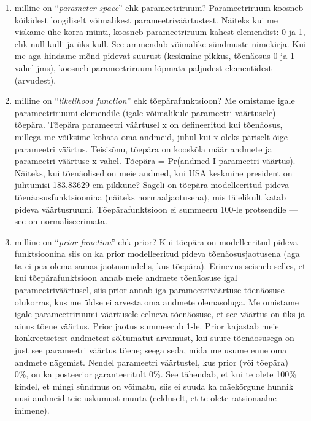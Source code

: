 \documentclass[]{book}
\begin{document}
\begin{enumerate}
\def\labelenumi{\arabic{enumi})}
\item
  milline on ``\emph{parameter space}'' ehk parameetriruum?
  Parameetriruum koosneb kõikidest loogiliselt võimalikest
  parameetriväärtustest. Näiteks kui me viskame ühe korra münti, koosneb
  parameetriruum kahest elemendist: 0 ja 1, ehk null kulli ja üks kull.
  See ammendab võimalike sündmuste nimekirja. Kui me aga hindame mõnd
  pidevat suurust (keskmine pikkus, tõenäosus 0 ja 1 vahel jms), koosneb
  parameetriruum lõpmata paljudest elementidest (arvudest).
\item
  milline on ``\emph{likelihood function}'' ehk tõepärafunktsioon? Me
  omistame igale parameetriruumi elemendile (igale võimalikule
  parameetri väärtusele) tõepära. Tõepära parameetri väärtusel x on
  defineeritud kui tõenäosus, millega me võiksime kohata oma andmeid,
  juhul kui x oleks päriselt õige parameetri väärtus. Teisisõnu, tõepära
  on kooskõla määr andmete ja parameetri väärtuse x vahel. Tõepära =
  Pr(andmed I parameetri väärtus). Näiteks, kui tõenäolised on meie
  andmed, kui USA keskmine president on juhtumisi 183.83629 cm pikkune?
  Sageli on tõepära modelleeritud pideva tõenäosusfunktsioonina (näiteks
  normaaljaotusena), mis täielikult katab pideva väärtusruumi.
  Tõepärafunktsioon ei summeeru 100-le protsendile --- see on
  normaliseerimata.
\item
  milline on ``\emph{prior function}'' ehk prior? Kui tõepära on
  modelleeritud pideva funktsioonina siis on ka prior modelleeritud
  pideva tõenäosusjaotusena (aga ta ei pea olema samas jaotusmudelis,
  kus tõepära). Erinevus seisneb selles, et kui tõepärafunktsioon annab
  meie andmete tõenäosuse igal parameetriväärtusel, siis prior annab iga
  parameetriväärtuse tõenäosuse olukorras, kus me üldse ei arvesta oma
  andmete olemasoluga. Me omistame igale parameetriruumi väärtusele
  eelneva tõenäosuse, et see väärtus on üks ja ainus tõene väärtus.
  Prior jaotus summeerub 1-le. Prior kajastab meie konkreetsetest
  andmetest sõltumatut arvamust, kui suure tõenäosusega on just see
  parameetri väärtus tõene; seega seda, mida me usume enne oma andmete
  nägemist. Nendel parameetri väärtustel, kus prior (või tõepära) = 0\%,
  on ka posteerior garanteeritult 0\%. See tähendab, et kui te olete
  100\% kindel, et mingi sündmus on võimatu, siis ei suuda ka mäekõrgune
  hunnik uusi andmeid teie uskumust muuta (eelduselt, et te olete
  ratsionaalne inimene).
\end{enumerate}
\end{document}
